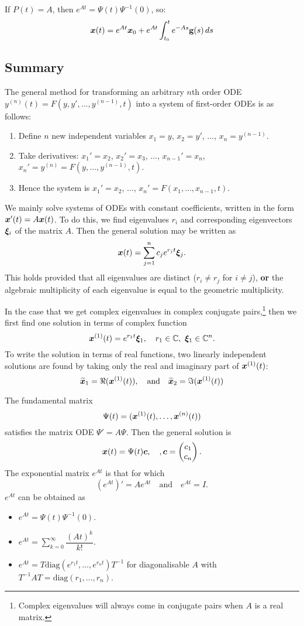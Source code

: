\begin{remark}
	If $P(t) = A$, then $e^{At} = \Psi(t) \Psi^{-1}(0)$, so:
	\[
	\bm{x}(t) = e^{At} \bm{x}_0 + e^{At} \int_{t_0}^t e^{-As} \textbf{g}(s)\,ds
	\]
\end{remark}

\pagebreak
\subsection{Summary}

The general method for transforming an arbitrary $n$th order ODE $y^{(n)}(t) = F(y, y', \ldots, y^{(n-1)}, t)$ into a system of first-order ODEs is as follows:
\begin{enumerate}
	\item Define $n$ new independent variables $x_1 = y$, $x_2 = y'$, $\ldots$, $x_n = y^{(n-1)}$.
	\item{Take derivatives: $x_1' = x_2$, $x_2' = x_3$, $\ldots$, $x_{n-1}' = x_n$, $x_n' = y^{(n)} = F(y, \ldots, y^{(n-1)}, t)$.}
	\item{Hence the system is $x_1' = x_2$, $\ldots$, $x_n' = F(x_1, \ldots, x_{n-1}, t)$.}
\end{enumerate}

We mainly solve systems of ODEs with constant coefficients, written in the form $\bm{x}'(t) = A\bm{x}(t)$. To do this, we find eigenvalues $r_i$ and corresponding eigenvectors $\bm{\xi}_i$ of the matrix $A$. Then the general solution may be written as
\[
\bm{x}(t) = \sum_{j=1}^n c_j e^{r_jt} \bm{\xi}_j.
\]
This holds provided that all eigenvalues are distinct ($r_i \neq r_j$ for $i \neq j$), \textbf{or} the algebraic multiplicity of each eigenvalue is equal to the geometric multiplicity.

In the case that we get complex eigenvalues in complex conjugate pairs,\footnote{Complex eigenvalues will always come in conjugate pairs when $A$ is a real matrix.} then we first find one solution in terms of complex function
\[
\bm{x}^{(1)}(t) = e^{r_1t}\bm{\xi}_1, \quad r_1 \in \mathbb{C}, \,\,\bm{\xi}_1 \in \mathbb{C}^n.
\]
To write the solution in terms of real functions, two linearly independent solutions are found by taking only the real and imaginary part of $\bm{x}^{(1)}(t)$:
\[
\widetilde{\bm{x}}_1 = \Re(\bm{x}^{(1)}(t)), \quad \text{and} \quad \widetilde{\bm{x}}_2 = \Im(\bm{x}^{(1)}(t))
\]

The fundamental matrix
\[
\Psi(t) = (\bm{x}^{(1)}(t), \dots, \bm{x}^{(n)}(t))
\]
satisfies the matrix ODE $\Psi' = A\Psi$. Then the general solution is
\[
\bm{x}(t) = \Psi(t) \bm{c}, \quad, \bm{c} = \begin{pmatrix}c_1 \\ c_n\end{pmatrix}.
\]
The exponential matrix $e^{At}$ is that for which
\[
\left(e^{At}\right)' = Ae^{At} \quad \text{and} \quad e^{At} = I.
\]
$e^{At}$ can be obtained as
\begin{itemize}
	\item $e^{At} = \Psi(t)\Psi^{-1}(0)$.
	\item $e^{At} = \sum\limits_{k=0}^{\infty} \dfrac{(At)^k}{k!}$.
	\item $e^{At} = T \text{diag}(e^{r_1t}, \dots, e^{r_nt})T^{-1}$ for diagonalisable $A$ with $T^{-1}AT = \text{diag}(r_1, \dots, r_n)$.
\end{itemize}

